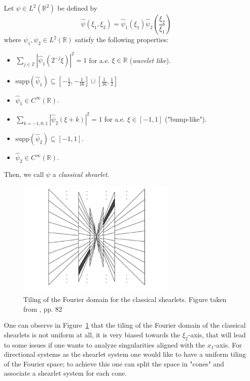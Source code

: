 \begin{defn}
\label{def:classical_shearlets}
Let $\psi\in L^2(\mathbb{R}^2)$ be defined by
$$
\hat{\psi}(\xi_1,\xi_2)=\hat{\psi}_1(\xi_1)\hat{\psi}_2\left(\frac{\xi_2}{\xi_1}\right)
$$
where $\psi_1,\psi_2\in L^2(\mathbb{R})$ satisfy the following properties:
\begin{itemize}
\item $\sum_{j\in\mathbb{Z}} |\hat{\psi}_1(2^{-j}\xi)|^2=1$ for a.e. $\xi\in\mathbb{R}$ (\textit{wavelet like}).
\item $\text{supp}(\hat{\psi}_1)\subseteq \left[ -\frac{1}{2},-\frac{1}{16}\right]\cup\left[\frac{1}{16},\frac{1}{2}\right]$
\item $\hat{\psi}_1\in C^{\infty}(\mathbb{R})$.
\item $\sum_{k=-1,0,1}|\hat{\psi}_2(\xi+k)|^2=1$ for a.e. $\xi\in [-1,1]$ ("bump-like").
\item $\text{supp}(\hat{\psi}_2)\subseteq [-1,1]$.
\item $\hat{\psi}_2\in C^{\infty}(\mathbb{R})$.
\end{itemize}
Then, we call $\psi$ a \textit{classical shearlet}.
\end{defn}

\begin{figure}[!tbp]
  \centering
   \includegraphics[width=0.7\textwidth]{./Diagrams/tiling_nocone.jpg}
    \caption{Tiling of the Fourier domain for the classical shearlets. Figure taken from \cite{Gitta-notes}, pp. 82}
  \label{fig:tiling_nocone}

\end{figure}

One can observe in Figure~\ref{fig:tiling_nocone} that the tiling of the Fourier domain of the classical shearlets is not uniform at all, it is very biased towards the $\xi_2$-axis, that will lead to some issues if one wants to analyze singularities aligned with the $x_1$-axis. For directional systems as the shearlet system one would like to have a uniform tiling of the Fourier space; to achieve this one can split the space in "cones" and associate a shearlet system for each cone. 

